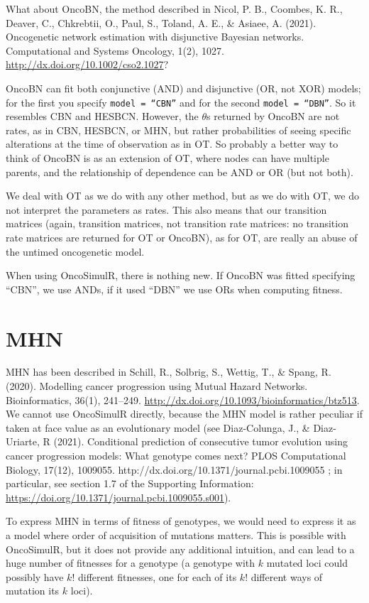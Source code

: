 \documentclass[11pt]{article}
\begin{document}
What about OncoBN, the method described in Nicol, P. B., Coombes, K. R., Deaver, C., Chkrebtii, O., Paul, S., Toland, A. E., \& Asiaee, A. (2021). Oncogenetic network estimation with disjunctive Bayesian networks. Computational and Systems Oncology, 1(2), 1027. \url{http://dx.doi.org/10.1002/cso2.1027}?

OncoBN can fit both conjunctive (AND) and disjunctive (OR, not XOR) models; for the first you specify \texttt{model = ``CBN''} and for the second \texttt{model = ``DBN''}. So it resembles CBN and HESBCN. However, the $\theta$s returned by OncoBN are not rates, as in CBN, HESBCN, or MHN, but rather probabilities of seeing specific alterations at the time of observation as in OT. So probably a better way to think of OncoBN is as an extension of OT, where nodes can have multiple parents, and the relationship of dependence can be AND or OR (but not both).

We deal with OT as we do with any other method, but as we do with OT, we do not interpret the parameters as rates. This also means that our transition matrices (again, transition matrices, not transition rate matrices: no transition rate matrices are returned for OT or OncoBN), as for OT, are really an abuse of the untimed oncogenetic model.

When using OncoSimulR, there is nothing new. If OncoBN was fitted specifying  ``CBN'', we use ANDs, if it used ``DBN'' we use ORs when computing fitness. 



\section{MHN}\label{MHN}

MHN has been described in Schill, R., Solbrig, S., Wettig, T., \& Spang, R. (2020). Modelling cancer progression using Mutual Hazard Networks. Bioinformatics, 36(1), 241–249. \url{http://dx.doi.org/10.1093/bioinformatics/btz513}. We cannot use OncoSimulR directly, because the MHN model is rather peculiar if taken at face value as an evolutionary model (see Diaz-Colunga, J., \& Diaz-Uriarte, R (2021). Conditional prediction of consecutive tumor evolution using cancer progression models: What genotype comes next? PLOS Computational Biology, 17(12), 1009055. http://dx.doi.org/10.1371/journal.pcbi.1009055 ; in particular, see section 1.7 of the Supporting Information: \url{https://doi.org/10.1371/journal.pcbi.1009055.s001}).

To express MHN in terms of fitness of genotypes, we would need to express it as a model where order of acquisition of mutations matters. This is possible with OncoSimulR, but it does not provide any additional intuition, and can lead to a huge number of fitnesses for a genotype (a genotype with $k$ mutated loci could possibly have $k!$ different fitnesses, one for each of its $k!$ different ways of mutation its $k$ loci).
\end{document}
